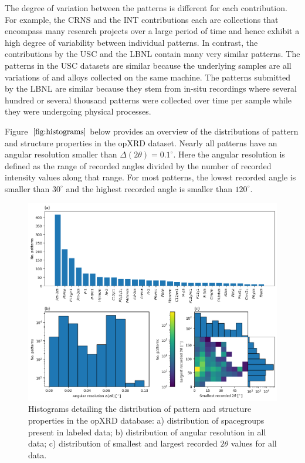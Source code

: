 The degree of variation between the patterns is different for each contribution. For example, the CRNS and the INT contributions each are collections that encompass many research projects over a large period of time and hence exhibit a high degree of variability between individual patterns. In contrast, the contributions by the USC and the LBNL contain many very similar patterns. The patterns in the USC datasets are similar because the underlying samples are all variations of  and  alloys collected on the same machine. The patterns submitted by the LBNL are similar because they stem from in-situ recordings where several hundred or several thousand patterns were collected over time per sample while they were undergoing physical processes. 

\pagebreak

Figure~$\eqref{fig:histograms}$ below provides an overview of the distributions of pattern and structure properties in the opXRD dataset. Nearly all patterns have an angular resolution smaller than $\Delta(2\theta) = 0.1 ^\circ$. Here the angular resolution is defined as the range of recorded angles divided by the number of recorded intensity values along that range. For most patterns, the lowest recorded angle is smaller than $30 ^\circ$ and the highest recorded angle is smaller than $120 ^\circ$.

\begin{figure}[!htb]
    \centering
    \includegraphics[width=0.8\linewidth]{figures/hist.png}
    \caption{Histograms detailing the distribution of pattern and structure properties in the opXRD database: a) distribution of spacegroups present in labeled data; b) distribution of angular resolution in all data; c) distribution of smallest and largest recorded $2\theta$ values for all data.}
    \label{fig:histograms}
\end{figure}



